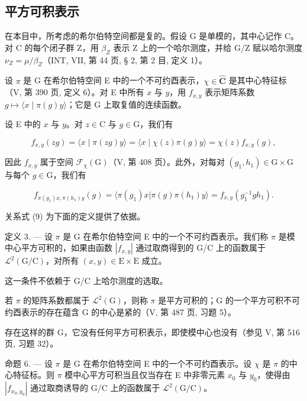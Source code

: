\subsection{平方可积表示}

在本目中，所考虑的希尔伯特空间都是复的。假设 G 是单模的，其中心记作 C。对 C 的每个闭子群 Z，用 \(\beta_{Z}\) 表示 Z 上的一个哈尔测度，并给 G/Z 赋以哈尔测度 \(\nu_{Z} = \mu/\beta_{Z}\)（INT, VII, 第 44 页, § 2, 第 2 目, 定义 1）。

设 \(\pi\) 是 G 在希尔伯特空间 E 中的一个不可约酉表示，\(\chi \in \widehat{\mathbf{C}}\) 是其中心特征标（V, 第 390 页, 定义 6）。对 E 中所有 \(x\) 与 \(y\)，用 \(f_{x,y}\) 表示矩阵系数 \(g \mapsto \langle x \mid \pi(g)y \rangle\)；它是 G 上取复值的连续函数。

设 E 中的 \(x\) 与 \(y\)。对 \(z \in \mathrm{C}\) 与 \(g \in \mathrm{G}\)，我们有

\[
f _ {x, y} (z g) = \langle x \mid \pi (z g) y \rangle = \langle x \mid \chi (z) \pi (g) y \rangle = \chi (z) f _ {x, y} (g),\tag{9}
\]

因此 \(f_{x,y}\) 属于空间 \(\mathcal{F}_{\chi}(\mathrm{G})\)（V, 第 408 页）。此外，对每对 \((g_1, h_1) \in \mathrm{G} \times \mathrm{G}\) 与每个 \(g \in \mathrm{G}\)，我们有

\[
f _ {\pi (g _ {1}) x, \pi (h _ {1}) y} (g) = \langle \pi (g _ {1}) x | \pi (g) \pi (h _ {1}) y \rangle = f _ {x, y} (g _ {1} ^ {- 1} g h _ {1}).\tag{10}
\]

关系式 (9) 为下面的定义提供了依据。

定义 3. --- 设 \(\pi\) 是 G 在希尔伯特空间 E 中的一个不可约酉表示。我们称 \(\pi\) 是模中心平方可积的，如果由函数 \(|f_{x,y}|\) 通过取商得到的 G/C 上的函数属于 \(\mathcal{L}^2 (\mathrm{G / C})\)，对所有 \((x,y)\in \mathrm{E}\times \mathrm{E}\) 成立。

这一条件不依赖于 G/C 上哈尔测度的选取。

若 \(\pi\) 的矩阵系数都属于 \(\mathcal{L}^2 (\mathrm{G})\)，则称 \(\pi\) 是平方可积的；G 的一个平方可积不可约酉表示的存在蕴含 G 的中心是紧的（V, 第 487 页, 习题 5）。

存在这样的群 G，它没有任何平方可积表示，即使模中心也没有（参见 V, 第 516 页, 习题 32）。

命题 6. --- 设 \(\pi\) 是 G 在希尔伯特空间 E 中的一个不可约酉表示。设 \(\chi\) 是 \(\pi\) 的中心特征标。则 \(\pi\) 模中心平方可积当且仅当存在 E 中非零元素 \(x_0\) 与 \(y_0\)，使得由 \(|f_{x_0,y_0}|\) 通过取商诱导的 G/C 上的函数属于 \(\mathcal{L}^2 (\mathrm{G / C})\)。

